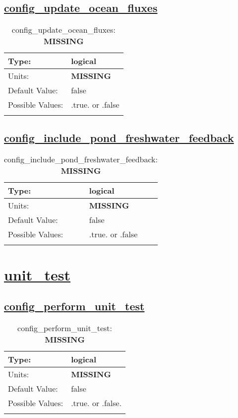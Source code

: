 \subsection[config\_update\_ocean\_fluxes]{\hyperref[sec:nm_tab_forcing]{config\_update\_ocean\_fluxes}}
\label{subsec:nm_sec_config_update_ocean_fluxes}
\begin{center}
\begin{longtable}{| p{2.0in} || p{4.0in} |}
    \hline
    Type: & logical \\
    \hline
    Units: & {\bf \color{red} MISSING} \\
    \hline
    Default Value: & false \\
    \hline
    Possible Values: & .true. or .false \\
    \hline
    \caption{config\_update\_ocean\_fluxes: {\bf \color{red} MISSING}}
\end{longtable}
\end{center}
\subsection[config\_include\_pond\_freshwater\_feedback]{\hyperref[sec:nm_tab_forcing]{config\_include\_pond\_freshwater\_feedback}}
\label{subsec:nm_sec_config_include_pond_freshwater_feedback}
\begin{center}
\begin{longtable}{| p{2.0in} || p{4.0in} |}
    \hline
    Type: & logical \\
    \hline
    Units: & {\bf \color{red} MISSING} \\
    \hline
    Default Value: & false \\
    \hline
    Possible Values: & .true. or .false \\
    \hline
    \caption{config\_include\_pond\_freshwater\_feedback: {\bf \color{red} MISSING}}
\end{longtable}
\end{center}
\section[unit\_test]{\hyperref[sec:nm_tab_unit_test]{unit\_test}}
\label{sec:nm_sec_unit_test}
\subsection[config\_perform\_unit\_test]{\hyperref[sec:nm_tab_unit_test]{config\_perform\_unit\_test}}
\label{subsec:nm_sec_config_perform_unit_test}
\begin{center}
\begin{longtable}{| p{2.0in} || p{4.0in} |}
    \hline
    Type: & logical \\
    \hline
    Units: & {\bf \color{red} MISSING} \\
    \hline
    Default Value: & false \\
    \hline
    Possible Values: & .true. or .false. \\
    \hline
    \caption{config\_perform\_unit\_test: {\bf \color{red} MISSING}}
\end{longtable}
\end{center}
